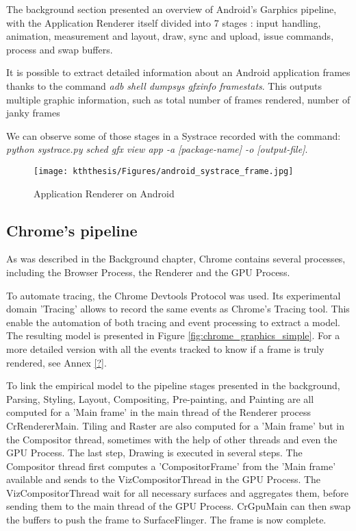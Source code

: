    The background section presented an overview of Android's Garphics pipeline, with the Application Renderer itself divided into 7 stages : input handling, animation, measurement and layout, draw, sync and upload, issue commands, process and swap buffers. 
    
    It is possible to extract detailed information about an Android application frames thanks to the command \textit{adb shell dumpsys gfxinfo framestats}. This outputs multiple graphic information, such as total number of frames rendered, number of janky frames
    
    We can observe some of those stages in a Systrace recorded with the command: \textit{python systrace.py sched gfx view app -a [package-name] -o [output-file]}.
    
    \begin{figure}[!ht]
        \texttt{[image: kththesis/Figures/android\_systrace\_frame.jpg]}
        \caption{Application Renderer on Android}
        \label{fig:android_systrace}
    \end{figure}
    
    
    \subsection{Chrome's pipeline}
       As was described in the Background chapter, Chrome contains several processes, including the Browser Process, the Renderer and the GPU Process.
       
       To automate tracing, the Chrome Devtools Protocol was used. Its experimental domain 'Tracing' allows to record the same events as Chrome's Tracing tool. This enable the automation of both tracing and event processing to extract a model. \newline
The resulting model is presented in Figure \ref{fig:chrome_graphics_simple}. For a more detailed version with all the events tracked to know if a frame is truly rendered, see Annex \ref{?}.

To link the empirical model to the pipeline stages presented in the background, Parsing, Styling, Layout, Compositing, Pre-painting, and Painting are all computed for a 'Main frame' in the main thread of the Renderer process CrRendererMain. Tiling and Raster are also computed for a 'Main frame' but in the Compositor thread, sometimes with the help of other threads and even the GPU Process. The last step, Drawing is executed in several steps. The Compositor thread first computes a 'CompositorFrame' from the 'Main frame' available and sends to the VizCompositorThread in the GPU Process. The VizCompositorThread wait for all necessary surfaces and aggregates them, before sending them to the main thread of the GPU Process. CrGpuMain can then swap the buffers to push the frame to SurfaceFlinger. The frame is now complete.

